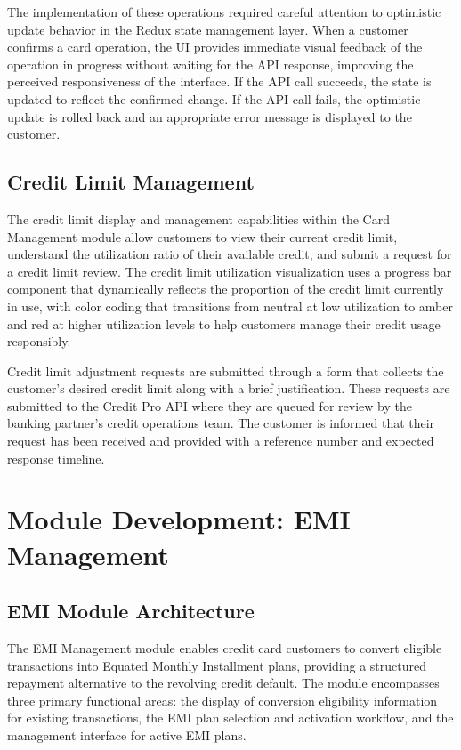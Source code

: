 The implementation of these operations required careful attention to optimistic update behavior in the Redux state management layer. When a customer confirms a card operation, the UI provides immediate visual feedback of the operation in progress without waiting for the API response, improving the perceived responsiveness of the interface. If the API call succeeds, the state is updated to reflect the confirmed change. If the API call fails, the optimistic update is rolled back and an appropriate error message is displayed to the customer.

\subsection{Credit Limit Management}

The credit limit display and management capabilities within the Card Management module allow customers to view their current credit limit, understand the utilization ratio of their available credit, and submit a request for a credit limit review. The credit limit utilization visualization uses a progress bar component that dynamically reflects the proportion of the credit limit currently in use, with color coding that transitions from neutral at low utilization to amber and red at higher utilization levels to help customers manage their credit usage responsibly.

Credit limit adjustment requests are submitted through a form that collects the customer's desired credit limit along with a brief justification. These requests are submitted to the Credit Pro API where they are queued for review by the banking partner's credit operations team. The customer is informed that their request has been received and provided with a reference number and expected response timeline.

\section{Module Development: EMI Management}

\subsection{EMI Module Architecture}

The EMI Management module enables credit card customers to convert eligible transactions into Equated Monthly Installment plans, providing a structured repayment alternative to the revolving credit default. The module encompasses three primary functional areas: the display of conversion eligibility information for existing transactions, the EMI plan selection and activation workflow, and the management interface for active EMI plans.

